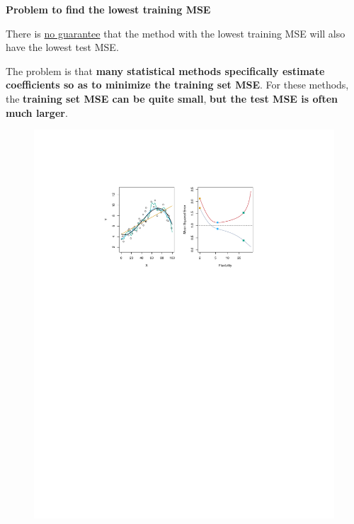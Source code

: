 \documentclass[a4paper]{article}
\begin{document}
    \begin{flushleft}
        \textcolor{Red2}{ \textbf{Problem to find the lowest training MSE}}
    \end{flushleft}
    There is \underline{no guarantee} that the method with the lowest training MSE will also have the lowest test MSE. 
    
    The problem is that \textbf{many statistical methods specifically estimate coefficients so as to minimize the training set MSE}. For these methods, the \textbf{training set MSE can be quite small}, \textbf{but the test MSE is often much larger}.
    
    \newpage

    \begin{figure}[!htp]
        \begin{examplebox}
            \begin{center}
                \includegraphics[width=\textwidth]{img/measuring-the-quality-of-fit-1.pdf}

\end{center}
\end{examplebox}
\end{figure}
\end{document}
